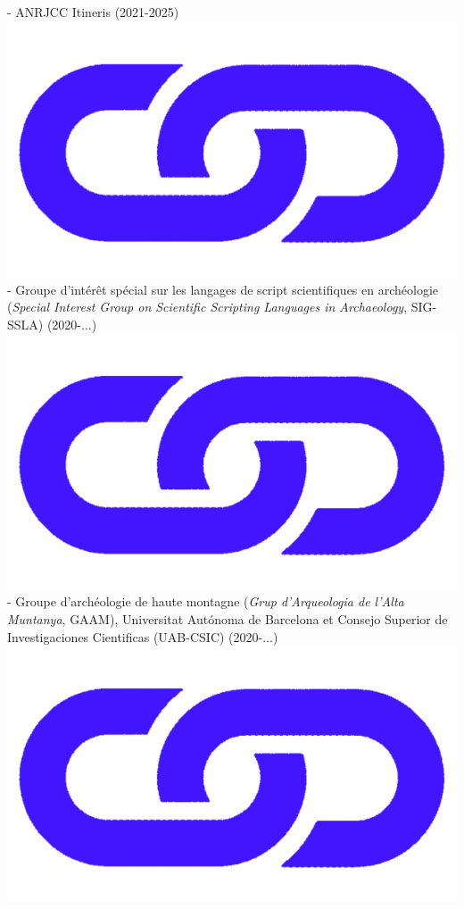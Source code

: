 \documentclass{article}
\begin{document}
- ANRJCC Itineris (2021-2025) \href{https://anr.fr/Project-ANR-21-CE27-0010}{\includegraphics[scale=0.02]{link_darkblue.png}}\\ 
- Groupe d'intérêt spécial sur les langages de script scientifiques en archéologie (\textit{Special Interest Group on Scientific Scripting Languages in Archaeology}, SIG-SSLA) (2020-...) \href{https://sslarch.github.io/}{\includegraphics[scale=0.02]{link_darkblue.png}}\\ 
- Groupe d'archéologie de haute montagne (\textit{Grup d'Arqueologia de l'Alta Muntanya}, GAAM), Universitat Aut\'{o}noma de Barcelona et Consejo Superior de Investigaciones Cientificas (UAB-CSIC) (2020-...)\href{https://arqueologiademuntanya.wordpress.com/}{\includegraphics[scale=0.02]{link_darkblue.png}}\\ 
\end{document}
